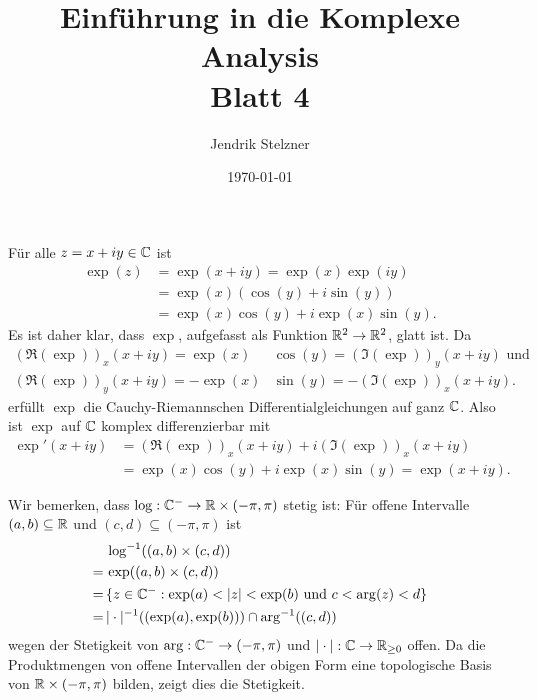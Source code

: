 \documentclass[a4paper,10pt]{article}
\title{\sc Einführung in die Komplexe Analysis \\ \Large Blatt 4}
\author{Jendrik Stelzner}
\date{\today}
\begin{document}
\maketitle






\addtocounter{section}{3}





\section{}


\subsection{}
Für alle $z = x+iy \in \mathbb{C}$ ist
\begin{align*}
 \exp(z)
 &= \exp(x+iy) = \exp(x) \exp(iy) \\
 &= \exp(x)(\cos(y) + i\sin(y)) \\
 &= \exp(x)\cos(y) + i\exp(x)\sin(y). 
\end{align*}
Es ist daher klar, dass $\exp$, aufgefasst als Funktion $\mathbb{R}^2 \to \mathbb{R}^2$, glatt ist. Da
\begin{align*}
 (\Re(\exp))_x(x+iy) = \exp(x)&\cos(y) = (\Im(\exp))_y(x+iy) \text{ und} \\
 (\Re(\exp))_y(x+iy) = -\exp(x)&\sin(y) = -(\Im(\exp))_x(x+iy).
\end{align*}
erfüllt $\exp$ die Cauchy-Riemannschen Differentialgleichungen auf ganz $\mathbb{C}$. Also ist $\exp$ auf $\mathbb{C}$ komplex differenzierbar mit
\begin{align*}
 \exp'(x+iy)
 &= (\Re(\exp))_x(x+iy) + i(\Im(\exp))_x(x+iy) \\
 &= \exp(x)\cos(y) + i\exp(x)\sin(y)
 = \exp(x+iy).
\end{align*}

Wir bemerken, dass $\log : \mathbb{C}^- \to \mathbb{R} \times (-\pi,\pi)$ stetig ist: Für offene Intervalle $(a,b) \subseteq \mathbb{R}$ und $(c,d) \subseteq (-\pi,\pi)$ ist
\begin{align*}
  &\,\log^{-1}((a,b) \times (c,d)) \\
 =&\, \exp((a,b) \times (c,d)) \\
 =&\, \{z \in \mathbb{C}^- : \exp(a) < |z| < \exp(b) \text{ und } c < \arg(z) < d \} \\
 =&\, |\cdot|^{-1}((\exp(a),\exp(b))) \cap \arg^{-1}((c,d))
\end{align*}
wegen der Stetigkeit von $\arg : \mathbb{C}^- \to (-\pi,\pi)$ und $|\cdot| : \mathbb{C} \to \mathbb{R}_{\geq 0}$ offen. Da die Produktmengen von offene Intervallen der obigen Form eine topologische Basis von $\mathbb{R} \times (-\pi,\pi)$ bilden, zeigt dies die Stetigkeit.
\end{document}
